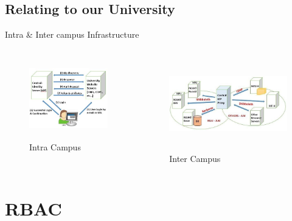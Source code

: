 \documentclass[xcolor=dvipsnames]{beamer}
\begin{document}
\subsection{Relating to our University}
\begin{frame}{Intra \& Inter campus Infrastructure}
\begin{columns}
\begin{figure}[H]
\includegraphics[width=4cm,height=3.5cm]{U1}
\caption{Intra Campus\label{fig:Intra Campus}}
\end{figure}
\begin{figure}[H]
\includegraphics[width=6cm,height=4cm]{ex1}
\caption{Inter Campus\label{fig:Inter Campus}}
\end{figure}
\end{columns}

\end{frame}

\section{RBAC}
\end{document}
